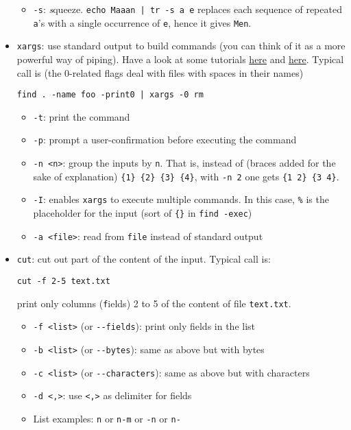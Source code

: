\documentclass[a4paper,12pt,%
              final%
              ]{article}
\begin{document}
\begin{itemize}
\begin{itemize}
      \item \verb|-s|: \emph{s}queeze. \verb!echo Maaan | tr -s a e! replaces each sequence of repeated \texttt{a}'s with a single occurrence of \texttt{e}, hence it gives \texttt{Men}.
    \end{itemize}
  \item \texttt{xargs}: use standard output to build commands (you can think of it as a more powerful way of piping). Have a look at some tutorials \href{https://shapeshed.com/unix-xargs/}{here} and \href{https://www.thegeekstuff.com/2013/12/xargs-examples/}{here}. Typical call is (the 0-related flags deal with files with spaces in their names)
\begin{verbatim}
find . -name foo -print0 | xargs -0 rm
\end{verbatim}
    \begin{itemize}
      \item \texttt{-t}: print the command
      \item \texttt{-p}: prompt a user-confirmation before executing the command
      \item \texttt{-n <n>}: group the inputs by \texttt{n}. That is, instead of (braces added for the sake of explanation) \verb|{1} {2} {3} {4}|, with \texttt{-n 2} one gets \verb|{1 2} {3 4}|.
      \item \texttt{-I}: enables \texttt{xargs} to execute multiple commands. In this case, \verb|%| is the placeholder for the input (sort of \verb|{}| in \verb|find -exec|)
      \item \texttt{-a <file>}: read from \texttt{file} instead of standard output
    \end{itemize}
  \item \texttt{cut}: cut out part of the content of the input. Typical call is:
\begin{verbatim}
cut -f 2-5 text.txt
\end{verbatim}
    print only columns (\texttt{f}ields) 2 to 5 of the content of file \verb|text.txt|.
    \begin{itemize}
      \item \verb|-f <list>| (or \verb|--fields|): print only fields in the list
      \item \verb|-b <list>| (or \verb|--bytes|): same as above but with bytes
      \item \verb|-c <list>| (or \verb|--characters|): same as above but with characters
      \item \verb|-d <,>|: use \verb|<,>| as delimiter for fields
      \item List examples: \texttt{n} or \texttt{n-m} or \texttt{-n} or \texttt{n-}

\end{itemize}
\end{itemize}
\end{document}
